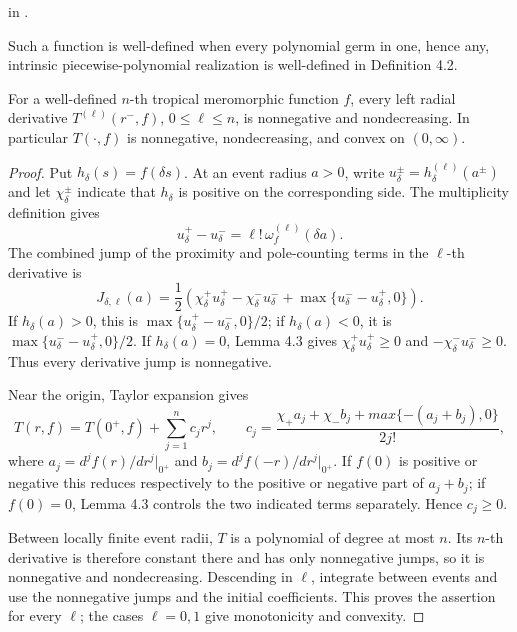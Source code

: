 \begin{leanproof}
 in
.
\end{leanproof}

\begin{definition}
\leanok
{}
Such a function is well-defined when every polynomial germ in one, hence any,
intrinsic piecewise-polynomial realization is well-defined in Definition 4.2.
\end{definition}

\begin{lemma}
\leanok
{}
For a well-defined $n$-th tropical meromorphic function $f$, every left radial
derivative $T^{(\ell)}(r^-,f)$, $0\leq\ell\leq n$, is nonnegative and
nondecreasing.  In particular $T(\cdot,f)$ is nonnegative, nondecreasing, and
convex on $(0,\infty)$.
\end{lemma}

\begin{proof}
\leanok
Put $h_\delta(s)=f(\delta s)$.  At an event radius $a>0$, write
$u_\delta^\pm=h_\delta^{(\ell)}(a^\pm)$ and let $\chi_\delta^\pm$ indicate
that $h_\delta$ is positive on the corresponding side.  The multiplicity
definition gives
\[
 u_\delta^+-u_\delta^-=\ell!\,\omega_f^{(\ell)}(\delta a).
\]
The combined jump of the proximity and pole-counting terms in the
$\ell$-th derivative is
\[
 J_{\delta,\ell}(a)=\frac12\left(
 \chi_\delta^+u_\delta^+-\chi_\delta^-u_\delta^-
 +\max\{u_\delta^--u_\delta^+,0\}\right).
\]
If $h_\delta(a)>0$, this is
$\max\{u_\delta^+-u_\delta^-,0\}/2$; if $h_\delta(a)<0$, it is
$\max\{u_\delta^--u_\delta^+,0\}/2$.  If $h_\delta(a)=0$, Lemma 4.3 gives
$\chi_\delta^+u_\delta^+\geq0$ and
$-\chi_\delta^-u_\delta^-\geq0$.  Thus every derivative jump is
nonnegative.

Near the origin, Taylor expansion gives
\[
 T(r,f)=T(0^+,f)+\sum_{j=1}^nc_jr^j,\qquad
 c_j=\frac{\chi_+a_j+\chi_-b_j+max\{-(a_j+b_j),0\}}{2j!},
\]
where $a_j=d^jf(r)/dr^j|_{0^+}$ and
$b_j=d^jf(-r)/dr^j|_{0^+}$.  If $f(0)$ is positive or negative this reduces
respectively to the positive or negative part of $a_j+b_j$; if $f(0)=0$,
Lemma 4.3 controls the two indicated terms separately.  Hence $c_j\geq0$.

Between locally finite event radii, $T$ is a polynomial of degree at most
$n$.  Its $n$-th derivative is therefore constant there and has only
nonnegative jumps, so it is nonnegative and nondecreasing.  Descending in
$\ell$, integrate between events and use the nonnegative jumps and the
initial coefficients.  This proves the assertion for every $\ell$; the cases
$\ell=0,1$ give monotonicity and convexity.
\end{proof}

